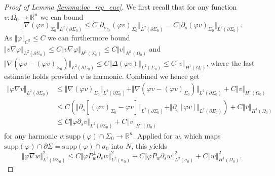\documentclass[10pt,reqno]{amsart}
\theoremstyle{plain}
\theoremstyle{definition}
\numberwithin{equation}{section}
\newcommand{\Om}{\Omega}
\newcommand{\si}{\sigma}
\newcommand{\Si}{\Sigma}
\newcommand{\vph}{\varphi}
\newcommand{\vphi}{\varphi}
\newcommand{\R}{\ensuremath{{\mathbb R}}}
\newcommand{\norm}[1]{\Vert#1\Vert}
\newcommand{\na}{\nabla}
\newcommand{\pSi}{{\partial \Sigma}}
\newcommand{\supp}{\text{supp}}
\newcommand{\p}{\partial} %
\begin{document}
\begin{proof}[Proof of Lemma \ref{lemma:loc_reg_euc}]
    We first recall that for any function $v:\Om_0\to \R^n$  we can bound
    \begin{equation}\label{est:extra-proof-1}
        \norm{\nabla (\vphi v)_{\Si_0}}_{L^2(\p \Si_0)} \leq C\norm{\p_{\nu_{\Si_0}} (\vphi v)_{\Si_0}}_{L^2(\p \Si_0)}=C\norm{\p_{s} (\vphi v)_{\Si_0}}_{L^2(\p \Si_0)}.
    \end{equation}
%
    As $\norm{\vph}_{C^2}\leq C$ we can furthermore  bound $\norm{v \na \vph}_{L^2(\p\Si_0)} \leq C\norm{v \na \vph}_{H^1(\Si_0)}\leq C\norm{v }_{H^1(\Om_0)}$ and $\norm{\nabla(\vph v - (\vph v)_{\Si_0})}_{L^2(\p\Si_0)} \leq C\norm{\Delta (\vphi v)}_{L^2(\Si_0)}\leq C\norm{v}_{H^1(\Omega_0)}$, where the last estimate holds provided $v$ is harmonic. Combined we hence get  
    \begin{align*}
        \norm{\vph \nabla v}_{L^2(\p\Si_0)} 
        &\leq \norm{\nabla(\vph v)_{\Si_0}}_{L^2(\p\Si_0)} + \norm{\nabla(\vph v - (\vph v)_{\Si_0})}_{L^2(\p\Si_0)} + C\norm{v }_{H^1(\Om_0)}\\
        &\leq C (\norm{\p_s[(\vph v)_{\Si_0}-\vphi v]}_{L^2(\p\Si_0)} + \norm{\p_s[\vphi v]}_{L^2(\p\Si_0)})+ C\norm{v }_{H^1(\Om_0)}\\
        &\leq C\norm{\vph\p_s v}_{L^2(\p\Si_0)} +C\norm{v }_{H^1(\Om_0)}
    \end{align*}
    for any harmonic $v:\supp(\vphi)\cap \Si_0\to \R^n$. Applied for $w$, which maps $\supp(\vph)\cap \pSi=\supp(\vph)\cap \si_0$ into $N$, this yields 
    \begin{equation}\label{est:cambidge-1}
        \norm{\vph \nabla w}_{L^2(\p\Si_0)}^2 \leq C\norm{\vph P_w^\perp\p_s w}_{L^2(\si_0)}^2 + C\norm{\vph P_w\p_s w}_{L^2(\si_0)}^2 + C\norm{w}_{H^1(\Omega_0)}^2.
    \end{equation}
 

\end{proof}
\end{document}
